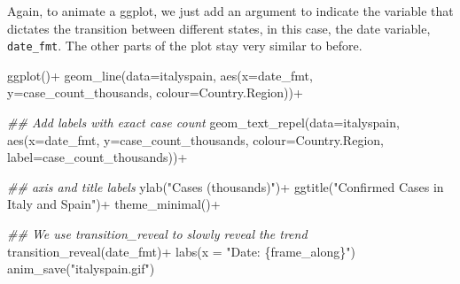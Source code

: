 \documentclass[
  letterpaper,
  DIV=11,
  numbers=noendperiod]{scrreprt}
\newenvironment{Shaded}{\begin{snugshade}}{\end{snugshade}}
\newcommand{\AttributeTok}[1]{\textcolor[rgb]{0.40,0.45,0.13}{#1}}
\newcommand{\DocumentationTok}[1]{\textcolor[rgb]{0.37,0.37,0.37}{\textit{#1}}}
\newcommand{\FunctionTok}[1]{\textcolor[rgb]{0.28,0.35,0.67}{#1}}
\newcommand{\NormalTok}[1]{\textcolor[rgb]{0.00,0.23,0.31}{#1}}
\newcommand{\SpecialCharTok}[1]{\textcolor[rgb]{0.37,0.37,0.37}{#1}}
\newcommand{\StringTok}[1]{\textcolor[rgb]{0.13,0.47,0.30}{#1}}
\begin{document}
Again, to animate a ggplot, we just add an argument to indicate the
variable that dictates the transition between different states, in this
case, the date variable, \texttt{date\_fmt}. The other parts of the plot
stay very similar to before.

\begin{Shaded}
\begin{Highlighting}[]
\FunctionTok{ggplot}\NormalTok{()}\SpecialCharTok{+}
  \FunctionTok{geom\_line}\NormalTok{(}\AttributeTok{data=}\NormalTok{italyspain, }\FunctionTok{aes}\NormalTok{(}\AttributeTok{x=}\NormalTok{date\_fmt, }\AttributeTok{y=}\NormalTok{case\_count\_thousands, }
                                 \AttributeTok{colour=}\NormalTok{Country.Region))}\SpecialCharTok{+}
  
  \DocumentationTok{\#\# Add labels with exact case count}
  \FunctionTok{geom\_text\_repel}\NormalTok{(}\AttributeTok{data=}\NormalTok{italyspain, }\FunctionTok{aes}\NormalTok{(}\AttributeTok{x=}\NormalTok{date\_fmt,  }
                                       \AttributeTok{y=}\NormalTok{case\_count\_thousands,}
                                       \AttributeTok{colour=}\NormalTok{Country.Region,}
                                 \AttributeTok{label=}\NormalTok{case\_count\_thousands))}\SpecialCharTok{+}
 
  \DocumentationTok{\#\# axis and title labels}
  \FunctionTok{ylab}\NormalTok{(}\StringTok{"Cases (thousands)"}\NormalTok{)}\SpecialCharTok{+}
  \FunctionTok{ggtitle}\NormalTok{(}\StringTok{"Confirmed Cases in Italy and Spain"}\NormalTok{)}\SpecialCharTok{+}
  \FunctionTok{theme\_minimal}\NormalTok{()}\SpecialCharTok{+}
  
  \DocumentationTok{\#\# We use transition\_reveal to slowly reveal the trend}
  \FunctionTok{transition\_reveal}\NormalTok{(date\_fmt)}\SpecialCharTok{+}
  \FunctionTok{labs}\NormalTok{(}\AttributeTok{x =} \StringTok{"Date: \{frame\_along\}"}\NormalTok{)}
\FunctionTok{anim\_save}\NormalTok{(}\StringTok{"italyspain.gif"}\NormalTok{)}
\end{Highlighting}
\end{Shaded}
\end{document}
